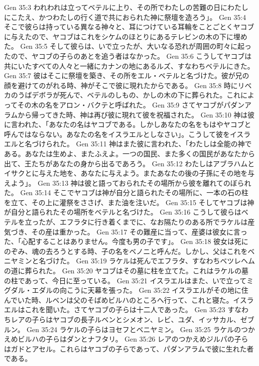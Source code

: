 Gen 35:3  われわれは立ってベテルに上り、その所でわたしの苦難の日にわたしにこたえ、かつわたしの行く道で共におられた神に祭壇を造ろう」。
Gen 35:4  そこで彼らは持っている異なる神々と、耳につけている耳輪をことごとくヤコブに与えたので、ヤコブはこれをシケムのほとりにあるテレビンの木の下に埋めた。
Gen 35:5  そして彼らは、いで立ったが、大いなる恐れが周囲の町々に起ったので、ヤコブの子らのあとを追う者はなかった。
Gen 35:6  こうしてヤコブは共にいたすべての人々と一緒にカナンの地にあるルズ、すなわちベテルにきた。
Gen 35:7  彼はそこに祭壇を築き、その所をエル・ベテルと名づけた。彼が兄の顔を避けてのがれる時、神がそこで彼に現れたからである。
Gen 35:8  時にリベカのうばデボラが死んで、ベテルのしもの、かしの木の下に葬られた。これによってその木の名をアロン・バクテと呼ばれた。
Gen 35:9  さてヤコブがパダンアラムから帰ってきた時、神は再び彼に現れて彼を祝福された。
Gen 35:10  神は彼に言われた、「あなたの名はヤコブである。しかしあなたの名をもはやヤコブと呼んではならない。あなたの名をイスラエルとしなさい」。こうして彼をイスラエルと名づけられた。
Gen 35:11  神はまた彼に言われた、「わたしは全能の神である。あなたは生めよ、またふえよ。一つの国民、また多くの国民があなたから出て、王たちがあなたの身から出るであろう。
Gen 35:12  わたしはアブラハムとイサクとに与えた地を、あなたに与えよう。またあなたの後の子孫にその地を与えよう」。
Gen 35:13  神は彼と語っておられたその場所から彼を離れてのぼられた。
Gen 35:14  そこでヤコブは神が自分と語られたその場所に、一本の石の柱を立て、その上に灌祭をささげ、また油を注いだ。
Gen 35:15  そしてヤコブは神が自分と語られたその場所をベテルと名づけた。
Gen 35:16  こうして彼らはベテルを立ったが、エフラタに行き着くまでに、なお隔たりのある所でラケルは産気づき、その産は重かった。
Gen 35:17  その難産に当って、産婆は彼女に言った、「心配することはありません。今度も男の子です」。
Gen 35:18  彼女は死にのぞみ、魂の去ろうとする時、子の名をベノニと呼んだ。しかし、父はこれをベニヤミンと名づけた。
Gen 35:19  ラケルは死んでエフラタ、すなわちベツレヘムの道に葬られた。
Gen 35:20  ヤコブはその墓に柱を立てた。これはラケルの墓の柱であって、今日に至っている。
Gen 35:21  イスラエルはまた、いで立ってミグダル・エダルの向こうに天幕を張った。
Gen 35:22  イスラエルがその地に住んでいた時、ルベンは父のそばめビルハのところへ行って、これと寝た。イスラエルはこれを聞いた。さてヤコブの子らは十二人であった。
Gen 35:23  すなわちレアの子らはヤコブの長子ルベンとシメオン、レビ、ユダ、イッサカル、ゼブルン。
Gen 35:24  ラケルの子らはヨセフとベニヤミン。
Gen 35:25  ラケルのつかえめビルハの子らはダンとナフタリ。
Gen 35:26  レアのつかえめジルパの子らはガドとアセル。これらはヤコブの子らであって、パダンアラムで彼に生れた者である。
